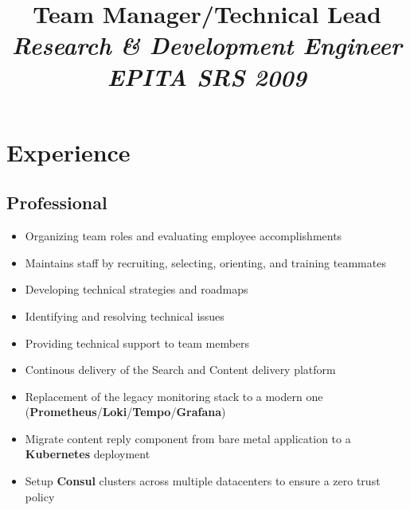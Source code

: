 \documentclass[11pt, a4paper]{moderncv}
\title{\textbf{Team Manager}/\textbf{Technical Lead}
       \newline \Large{\textit{Research \& Development Engineer}}
       \newline \large{\textit{EPITA SRS 2009}}}
\begin{document}
\maketitle

\section{Experience}
\subsection{Professional}
{
  \begin{itemize}
    \renewcommand{\labelitemi}{$\bullet$  }
    \item Organizing team roles and evaluating employee accomplishments
    \item Maintains staff by recruiting, selecting, orienting, and training teammates
  \end{itemize}
}
{
  \begin{itemize}
    \renewcommand{\labelitemi}{$\bullet$  }
    \item Developing technical strategies and roadmaps
    \item Identifying and resolving technical issues
    \item Providing technical support to team members
  \end{itemize}
}
{
  \begin{itemize}
    \renewcommand{\labelitemi}{$\bullet$  }
    \item Continous delivery of the Search and Content delivery platform
    \item Replacement of the legacy monitoring stack to a modern one
      (\textbf{Prometheus}/\textbf{Loki}/\textbf{Tempo}/\textbf{Grafana})
    \item Migrate content reply component from bare metal application to a
      \textbf{Kubernetes} deployment
    \item Setup \textbf{Consul} clusters across multiple datacenters to ensure
      a zero trust policy
  \end{itemize}
}
\end{document}
